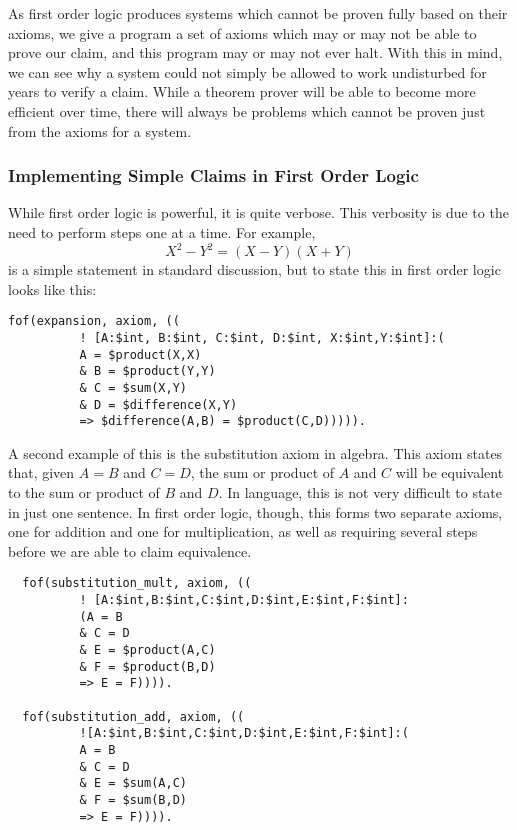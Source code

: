As first order logic produces systems which cannot be proven fully based on their axioms, we give a program a set of axioms which may or may not be able to prove our claim, and this program may or may not ever halt. With this in mind, we can see why a system could not simply be allowed to work undisturbed for years to verify a claim. While a theorem prover will be able to become more efficient over time, there will always be problems which cannot be proven just from the axioms for a system.

\pagebreak

\subsubsection{Implementing Simple Claims in First Order Logic}

While first order logic is powerful, it is quite verbose. This verbosity is due to the need to perform steps one at a time. For example, \[X^2-Y^2 = (X-Y)(X+Y)\] is a simple statement in standard discussion, but to state this in first order logic looks like this:

\begin{lstlisting}
fof(expansion, axiom, ((
          ! [A:$int, B:$int, C:$int, D:$int, X:$int,Y:$int]:(
          A = $product(X,X)
          & B = $product(Y,Y)
          & C = $sum(X,Y)     
          & D = $difference(X,Y)
          => $difference(A,B) = $product(C,D))))).
\end{lstlisting}

A second example of this is the substitution axiom in algebra. This axiom states that, given $A = B$ and $C = D$, the sum or product of $A$ and $C$ will be equivalent to the sum or product of $B$ and $D$. In language, this is not very difficult to state in just one sentence. In first order logic, though, this forms two separate axioms, one for addition and one for multiplication, as well as requiring several steps before we are able to claim equivalence.

\begin{lstlisting}
  fof(substitution_mult, axiom, ((
          ! [A:$int,B:$int,C:$int,D:$int,E:$int,F:$int]:
          (A = B
          & C = D
          & E = $product(A,C)
          & F = $product(B,D)
          => E = F)))).

  fof(substitution_add, axiom, (( 
          ![A:$int,B:$int,C:$int,D:$int,E:$int,F:$int]:(
          A = B
          & C = D
          & E = $sum(A,C)
          & F = $sum(B,D)
          => E = F)))).
\end{lstlisting}

